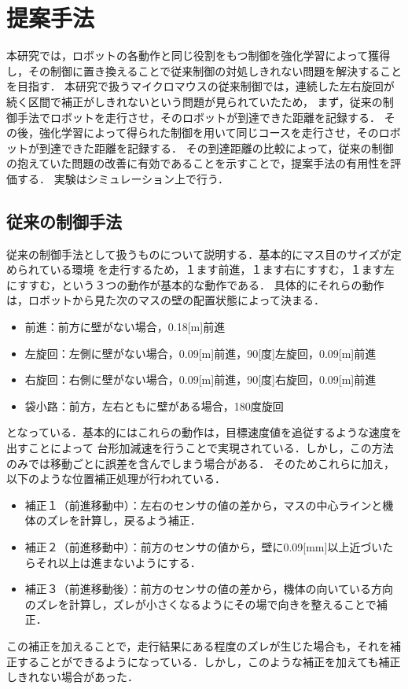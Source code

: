 \documentclass[a4paper,11pt]{jsarticle}
\begin{document}
\section{提案手法}
本研究では，ロボットの各動作と同じ役割をもつ制御を強化学習によって獲得し，その制御に置き換えることで従来制御の対処しきれない問題を解決することを目指す．
本研究で扱うマイクロマウスの従来制御では，連続した左右旋回が続く区間で補正がしきれないという問題が見られていたため，
まず，従来の制御手法でロボットを走行させ，そのロボットが到達できた距離を記録する．
その後，強化学習によって得られた制御を用いて同じコースを走行させ，そのロボットが到達できた距離を記録する．
その到達距離の比較によって，従来の制御の抱えていた問題の改善に有効であることを示すことで，提案手法の有用性を評価する．
実験はシミュレーション上で行う．
\subsection{従来の制御手法}
従来の制御手法として扱うものについて説明する．基本的にマス目のサイズが定められている環境
を走行するため，１ます前進，１ます右にすすむ，１ます左にすすむ，という３つの動作が基本的な動作である．
具体的にそれらの動作は，ロボットから見た次のマスの壁の配置状態によって決まる．
\begin{itemize}
  \item 前進：前方に壁がない場合，0.18[m]前進
  \item 左旋回：左側に壁がない場合，0.09[m]前進，90[度]左旋回，0.09[m]前進
  \item 右旋回：右側に壁がない場合，0.09[m]前進，90[度]右旋回，0.09[m]前進
  \item 袋小路：前方，左右ともに壁がある場合，180度旋回
\end{itemize}
となっている．基本的にはこれらの動作は，目標速度値を追従するような速度を出すことによって
台形加減速を行うことで実現されている．しかし，この方法のみでは移動ごとに誤差を含んでしまう場合がある．
そのためこれらに加え，以下のような位置補正処理が行われている．
\begin{itemize}
  \item 補正１（前進移動中）：左右のセンサの値の差から，マスの中心ラインと機体のズレを計算し，戻るよう補正．
  \item 補正２（前進移動中）：前方のセンサの値から，壁に0.09[mm]以上近づいたらそれ以上は進まないようにする．
  \item 補正３（前進移動後）：前方のセンサの値の差から，機体の向いている方向のズレを計算し，ズレが小さくなるようにその場で向きを整えることで補正．
\end{itemize}
この補正を加えることで，走行結果にある程度のズレが生じた場合も，それを補正することができるようになっている．しかし，このような補正を加えても補正しきれない場合があった．
\end{document}
